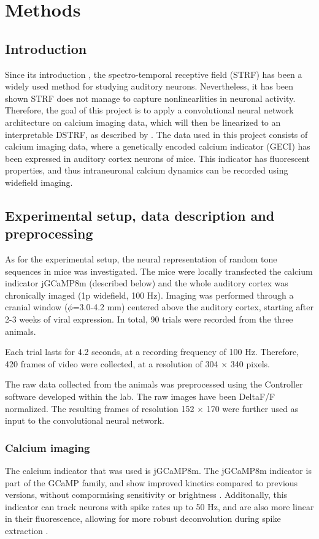\chapter{Methods}\label{methods}

\section{Introduction}
Since its introduction \parencite{aertsenSpectrotemporalReceptiveFields1980a}, the spectro-temporal receptive field (STRF) has been a widely used method for studying auditory neurons. Nevertheless, it has been shown STRF does not manage to capture nonlinearlities in neuronal activity. Therefore, the goal of this project is to apply a convolutional neural network architecture on calcium imaging data, which will then be linearized to an interpretable DSTRF, as described by \textcite{keshishianEstimatingInterpretingNonlinear2020}. 
The data used in this project consists of calcium imaging data, where a genetically encoded calcium indicator (GECI) has been expressed in auditory cortex neurons of mice. This indicator has fluorescent properties, and thus intraneuronal calcium dynamics can be recorded using widefield imaging.

\section{Experimental setup, data description and preprocessing}
As for the experimental setup, the neural representation of random tone sequences in mice  was investigated. The mice were locally transfected the calcium indicator jGCaMP8m (described below) and the whole auditory cortex was chronically imaged (1p widefield, 100 Hz). Imaging was performed through a cranial window ($\phi$=3.0-4.2 mm) centered above the auditory cortex, starting after 2-3 weeks of viral expression. In total, 90 trials were recorded from the three animals.

Each trial lasts for 4.2 seconds, at a recording frequency of 100 Hz. Therefore, 420 frames of video were collected, at a resolution of 304 $\times$ 340 pixels.

The raw data collected from the animals was preprocessed using the Controller software developed within the lab. The raw images have been DeltaF/F normalized. The resulting frames of resolution 152 $\times$ 170 were further used as input to the convolutional neural network.

\subsection{Calcium imaging}
The calcium indicator that was used is jGCaMP8m. The jGCaMP8m indicator is part of the GCaMP family, and show improved kinetics compared to previous versions, without compormising sensitivity or brightness \parencite{zhangFastSensitiveGCaMP2023}. Additonally, this indicator can track neurons with spike rates up to 50 Hz, and are also more linear in their fluorescence, allowing for more robust deconvolution during spike extraction \parencite{zhangFastSensitiveGCaMP2023}.

